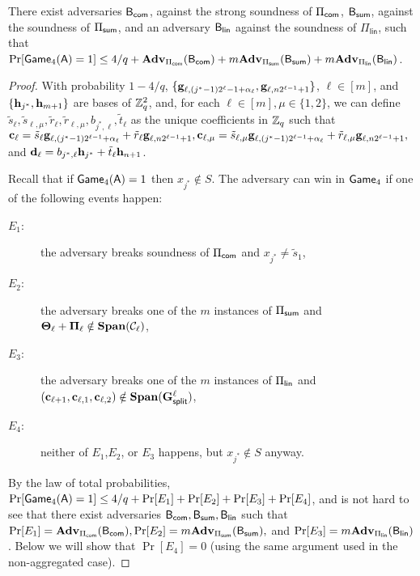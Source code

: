 \begin{lemma}
There exist adversaries \(\mathsf{B}_{\mathsf{com}}\), against the strong soundness of \(\Pi_{\mathsf{com}}\), \(\mathsf{B}_{\mathsf{sum}}\), against the soundness of \(\Pi_{\mathsf{sum}}\), and an adversary \(\mathsf{B}_\mathsf{lin}\) against the soundness of \(\Pi_\mathsf{lin}\), such that \(\Pr[\mathsf{Game}_4(\mathsf{A})=1]\leq 4/q+ \mathbf{Adv}_{\Pi_{\mathsf{com}}}(\mathsf{B}_{\mathsf{com}})+m\mathbf{Adv}_{\Pi_{\mathsf{sum}}}(\mathsf{B}_{\mathsf{sum}})+m\mathbf{Adv}_{\Pi_\mathsf{lin}}(\mathsf{B}_\mathsf{lin})\).
\end{lemma}
\begin{proof}
With probability \(1-4/q\), \(\{\mathbf{g}_{\ell,(j^*-1)2^\ell-1+\alpha_\ell},\mathbf{g}_{\ell,n2^{\ell-1}+1}\}\), \(\ell\in [m]\), and \(\{\mathbf{h}_{j^*},\allowbreak \mathbf{h}_{m+1}\}\) are bases of \(\mathbb{Z}_q^2\),
and, for each \(\ell\in [m],\mu\in\{1,2\}\), we can define \(\tilde{s}_\ell,\tilde{s}_{\ell,\mu},\tilde{r}_\ell,\tilde{r}_{\ell,\mu},b_{j^*,\ell},\tilde{t}_\ell\) as the unique coefficients in \(\mathbb{Z}_q\) such that \(\mathbf{c}_\ell=\allowbreak \tilde{s}_\ell\mathbf{g}_{\ell,(j^*-1)2^{\ell-1}+\alpha_\ell} + \tilde{r}_\ell \mathbf{g}_{\ell,n2^{\ell-1}+1}, \mathbf{c}_{\ell,\mu}=\tilde{s}_{\ell,\mu}\mathbf{g}_{\ell,(j^*-1)2^{\ell-1}+\alpha_\ell} + \tilde{r}_{\ell,\mu} \mathbf{g}_{\ell,n2^{\ell-1}+1},\) and \(\mathbf{d}_\ell= b_{j^*,\ell} \mathbf{h}_{j^*} + \tilde{t}_\ell \mathbf{h}_{n+1}\).

Recall that if \(\mathsf{Game}_4(\mathsf{A})=1\) then \(x_{j^*}\notin S\). The adversary can win in \(\mathsf{Game}_4\) if one of the following events happen:
\begin{description}
\item[\(E_1\):] the adversary breaks soundness of \(\Pi_{\mathsf{com}}\) and \(x_{j^*}\neq \tilde{s}_1\),
\item[\(E_2\):] the adversary breaks one of the \(m\)  instances of \(\Pi_{\mathsf{sum}}\) and \(\mathbf{{\Theta}}_\ell+\mathbf{{\Pi}}_\ell\notin\mathbf{Span}(\mathcal{C}_\ell)\),
\item[\(E_3\):] the adversary breaks one of the \(m\) instances of \(\Pi_{\mathsf{lin}}\) and \((\mathbf{c}_{\ell+1},\mathbf{c}_{\ell,1},\mathbf{c}_{\ell,2})\notin\mathbf{Span}(\mathbf{{G}}_\mathsf{split}^\ell)\),
\item[\(E_4\):] neither of \(E_1\),\(E_2\), or \(E_3\) happens, but \(x_{j^*}\notin S\) anyway.
\end{description}
By the law of total probabilities, \(\Pr[\mathsf{Game}_4(\mathsf{A})=1]\leq 4/q+\Pr[E_1]+\Pr[E_2]+\Pr[E_3]+\Pr[E_4]\), and is not hard to see that there exist adversaries \(\mathsf{B}_{\mathsf{com}},\mathsf{B}_{\mathsf{sum}},\mathsf{B}_\mathsf{lin}\) such that \(\Pr[E_1]=\mathbf{Adv}_{\Pi_{\mathsf{com}}}(\mathsf{B}_{\mathsf{com}}),\Pr[E_2]=m\mathbf{Adv}_{\Pi_{\mathsf{sum}}}(\mathsf{B}_{\mathsf{sum}}),\) and \(\Pr[E_3]=m\mathbf{Adv}_{\Pi_\mathsf{lin}}(\mathsf{B}_\mathsf{lin})\). Below we will show that \(\Pr[E_4]=0\) (using the same argument used in the non-aggregated case).


\end{proof}
